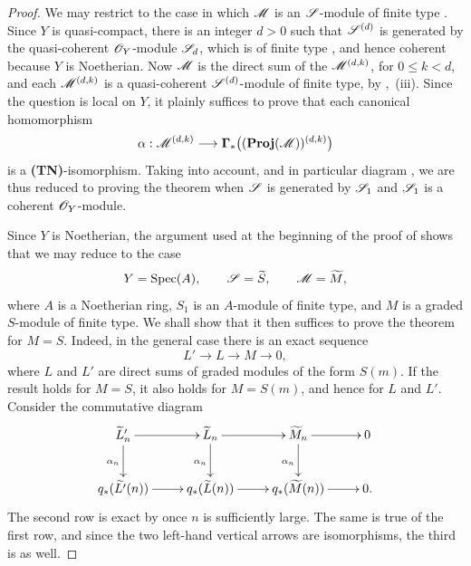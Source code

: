 \begin{proof}
We may restrict to the case in which $\mathscr{M}$ is an $\mathscr{S}$-module of finite type .
Since $Y$ is quasi-compact, there is an integer $d>0$ such that $\mathscr{S}^{(d)}$ is generated by the quasi-coherent $\mathscr{O}_Y$-module $\mathscr{S}_d$, which is of finite type , and hence coherent because $Y$ is Noetherian.
Now $\mathscr{M}$ is the direct sum of the $\mathscr{M}^{(d,k)}$, for $0\leq k<d$, and each $\mathscr{M}^{(d,k)}$ is a quasi-coherent $\mathscr{S}^{(d)}$-module of finite type, by ,~(iii).
Since the question is local on $Y$, it plainly suffices to prove that each canonical homomorphism
\[
  \alpha:\mathscr{M}^{(d,k)}
  \longrightarrow
  \boldsymbol{\Gamma}_*\bigl((\operatorname{\mathbf{Proj}}(\mathscr{M}))^{(d,k)}\bigr)
\]
is a \textbf{(TN)}-isomorphism.
Taking  into account, and in particular diagram , we are thus reduced to proving the theorem when $\mathscr{S}$ is generated by $\mathscr{S}_1$ and $\mathscr{S}_1$ is a coherent $\mathscr{O}_Y$-module.

Since $Y$ is Noetherian, the argument used at the beginning of the proof of  shows that we may reduce to the case
\[
  Y=\operatorname{Spec}(A),\qquad
  \mathscr{S}=\widetilde{S},\qquad
  \mathscr{M}=\widetilde{M},
\]
where $A$ is a Noetherian ring, $S_1$ is an $A$-module of finite type, and $M$ is a graded $S$-module of finite type.
We shall show that it then suffices to prove the theorem for $M=S$.
Indeed, in the general case there is an exact sequence
\[
  L'\longrightarrow L\longrightarrow M\longrightarrow0,
\]
where $L$ and $L'$ are direct sums of graded modules of the form $S(m)$.
If the result holds for $M=S$, it also holds for $M=S(m)$, and hence for $L$ and $L'$.
Consider the commutative diagram
\[
  \xymatrix{
    \widetilde{L}'_n\ar[r]\ar[d]_{\alpha_n} &
    \widetilde L_n\ar[r]\ar[d]_{\alpha_n} &
    \widetilde M_n\ar[r]\ar[d]_{\alpha_n} &
    0\\
    q_*(\widetilde{L'}(n))\ar[r] &
    q_*(\widetilde{L}(n))\ar[r] &
    q_*(\widetilde{M}(n))\ar[r] &
    0 .
  }
\]
The second row is exact by  once $n$ is sufficiently large.
The same is true of the first row, and since the two left-hand vertical arrows are isomorphisms, the third is as well.


\end{proof}
